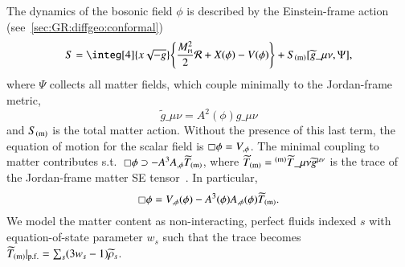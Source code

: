     The dynamics of the bosonic field $\phi$ is described by the Einstein-frame action (see~\cref{sec:GR:diffgeo:conformal}) 
    \begin{equation}\label{eq:cosmo:quintessence:quintessence_action_Einstein}
        S =\integ[4]{x\sqrt{-g}} \cclosed{ \frac{M\nped{Pl}^2}{2} \mathcal{R} + X(\phi) - V(\phi)} + S\ped{(m)}[\widetilde{g}\_{\mu\nu} , \Psi],
    \end{equation} 
    where $\Psi$ collects all matter fields, which couple minimally to the Jordan-frame metric,
    \begin{equation}
        \widetilde{g}\_{\mu\nu} = A^2 (\phi) g\_{\mu\nu}%
    \end{equation}
    and $S_\mathrm{(m)}$ is the total matter action. 
    Without the presence of this last term, the equation of motion for the scalar field is $\sq \phi = V_{,\phi}$. %
    The minimal coupling to matter contributes s.t.~$\sq\phi \supset - A^{3} A_{,\phi}\widetilde{T}\ped{(m)}$, where $\widetilde{T}\ped{(m)}= {}\ap{(m)}\widetilde{T}\_{\mu\nu}\widetilde{g}\^{\mu\nu}$ is the trace of the Jordan-frame matter SE tensor~\citep{hinterbichlerSymmetronCosmology2011,christiansenAsevolutionRelativisticNbody2023}. In particular, 
    \begin{equation}
        \sq\phi = V_{,\phi}(\phi) - A^{3}(\phi) A_{,\phi}(\phi)\widetilde{T}\ped{(m)}.
    \end{equation}
    We model the matter content as non-interacting, perfect fluids indexed $s$ with equation-of-state parameter $w_s$ such that the trace becomes $\widetilde{T}_\mathrm{(m)}\rvert_\mathrm{p.f.} = \sum_s (3w_s-1 )\widetilde{\rho}_s$.  

